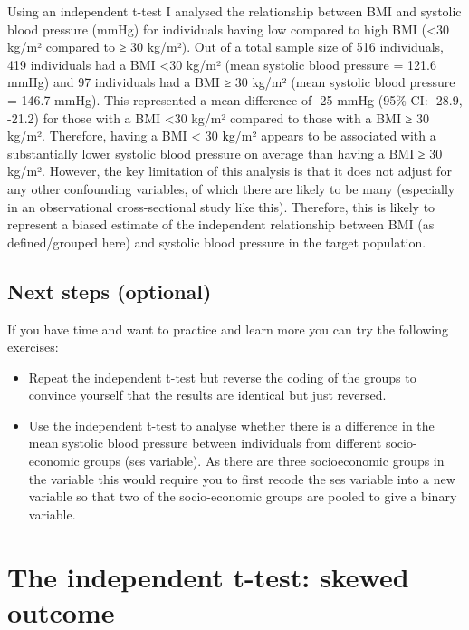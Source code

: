 \documentclass[
]{book}
\begin{document}
Using an independent t-test I analysed the relationship between BMI and systolic blood pressure (mmHg) for individuals having low compared to high BMI (\textless30 kg/m² compared to ≥ 30 kg/m²). Out of a total sample size of 516 individuals, 419 individuals had a BMI \textless30 kg/m² (mean systolic blood pressure = 121.6 mmHg) and 97 individuals had a BMI ≥ 30 kg/m² (mean systolic blood pressure = 146.7 mmHg). This represented a mean difference of -25 mmHg (95\% CI: -28.9, -21.2) for those with a BMI \textless30 kg/m² compared to those with a BMI ≥ 30 kg/m². Therefore, having a BMI \textless{} 30 kg/m² appears to be associated with a substantially lower systolic blood pressure on average than having a BMI ≥ 30 kg/m². However, the key limitation of this analysis is that it does not adjust for any other confounding variables, of which there are likely to be many (especially in an observational cross-sectional study like this). Therefore, this is likely to represent a biased estimate of the independent relationship between BMI (as defined/grouped here) and systolic blood pressure in the target population.

\hypertarget{next-steps-optional}{%
\section{Next steps (optional)}\label{next-steps-optional}}

If you have time and want to practice and learn more you can try the following exercises:

\begin{itemize}
\item
  Repeat the independent t-test but reverse the coding of the groups to convince yourself that the results are identical but just reversed.
\item
  Use the independent t-test to analyse whether there is a difference in the mean systolic blood pressure between individuals from different socio-economic groups (ses variable). As there are three socioeconomic groups in the variable this would require you to first recode the ses variable into a new variable so that two of the socio-economic groups are pooled to give a binary variable.
\end{itemize}

\hypertarget{the-independent-t-test-skewed-outcome}{%
\chapter{The independent t-test: skewed outcome}\label{the-independent-t-test-skewed-outcome}}
\end{document}
